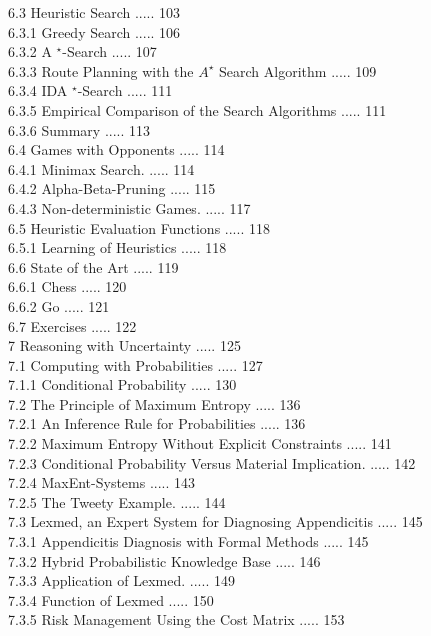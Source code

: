 \documentclass[10pt]{article}
\begin{document}
6.3 Heuristic Search ..... 103\\
6.3.1 Greedy Search ..... 106\\
6.3.2 A ${ }^{\star}$-Search ..... 107\\
6.3.3 Route Planning with the $A^{\star}$ Search Algorithm ..... 109\\
6.3.4 IDA ${ }^{\star}$-Search ..... 111\\
6.3.5 Empirical Comparison of the Search Algorithms ..... 111\\
6.3.6 Summary ..... 113\\
6.4 Games with Opponents ..... 114\\
6.4.1 Minimax Search. ..... 114\\
6.4.2 Alpha-Beta-Pruning ..... 115\\
6.4.3 Non-deterministic Games. ..... 117\\
6.5 Heuristic Evaluation Functions ..... 118\\
6.5.1 Learning of Heuristics ..... 118\\
6.6 State of the Art ..... 119\\
6.6.1 Chess ..... 120\\
6.6.2 Go ..... 121\\
6.7 Exercises ..... 122\\
7 Reasoning with Uncertainty ..... 125\\
7.1 Computing with Probabilities ..... 127\\
7.1.1 Conditional Probability ..... 130\\
7.2 The Principle of Maximum Entropy ..... 136\\
7.2.1 An Inference Rule for Probabilities ..... 136\\
7.2.2 Maximum Entropy Without Explicit Constraints ..... 141\\
7.2.3 Conditional Probability Versus Material Implication. ..... 142\\
7.2.4 MaxEnt-Systems ..... 143\\
7.2.5 The Tweety Example. ..... 144\\
7.3 Lexmed, an Expert System for Diagnosing Appendicitis ..... 145\\
7.3.1 Appendicitis Diagnosis with Formal Methods ..... 145\\
7.3.2 Hybrid Probabilistic Knowledge Base ..... 146\\
7.3.3 Application of Lexmed. ..... 149\\
7.3.4 Function of Lexmed ..... 150\\
7.3.5 Risk Management Using the Cost Matrix ..... 153\\
\end{document}
